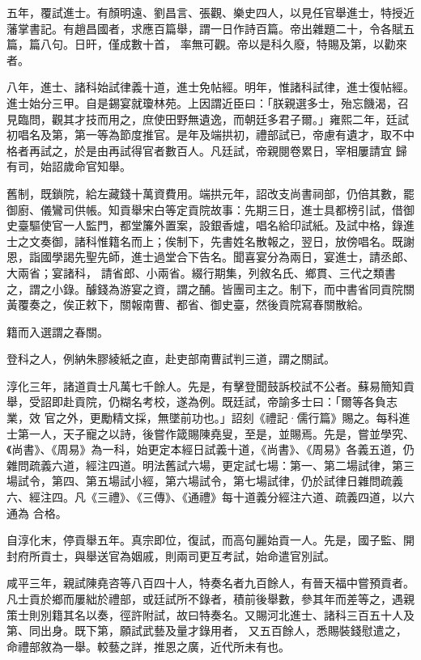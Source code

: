 \begin{pinyinscope}
 五年，覆試進士。有顏明遠、劉昌言、張觀、樂史四人，以見任官舉進士，特授近藩掌書記。有趙昌國者，求應百篇舉，謂一日作詩百篇。帝出雜題二十，令各賦五篇，篇八句。日旰，僅成數十首，
 率無可觀。帝以是科久廢，特賜及第，以勸來者。



 八年，進士、諸科始試律義十道，進士免帖經。明年，惟諸科試律，進士復帖經。進士始分三甲。自是錫宴就瓊林苑。上因謂近臣曰：「朕親選多士，殆忘饑渴，召見臨問，觀其才技而用之，庶使田野無遺逸，而朝廷多君子爾。」雍熙二年，廷試初唱名及第，第一等為節度推官。是年及端拱初，禮部試已，帝慮有遺才，取不中格者再試之，於是由再試得官者數百人。凡廷試，帝親閱卷累日，宰相屢請宜
 歸有司，始詔歲命官知舉。



 舊制，既鎖院，給左藏錢十萬資費用。端拱元年，詔改支尚書祠部，仍倍其數，罷御廚、儀鸞司供帳。知貢舉宋白等定貢院故事：先期三日，進士具都榜引試，借御史臺驅使官一人監門，都堂簾外置案，設銀香爐，唱名給印試紙。及試中格，錄進士之文奏御，諸科惟籍名而上；俟制下，先書姓名散報之，翌日，放傍唱名。既謝恩，詣國學謁先聖先師，進士過堂合下告名。聞喜宴分為兩日，宴進士，請丞郎、大兩省；宴諸科，
 請省郎、小兩省。綴行期集，列敘名氏、鄉貫、三代之類書之，謂之小錄。醵錢為游宴之資，謂之酺。皆團司主之。制下，而中書省同貢院關黃覆奏之，俟正敕下，關報南曹、都省、御史臺，然後貢院寫春關散給。



 籍而入選謂之春關。



 登科之人，例納朱膠綾紙之直，赴吏部南曹試判三道，謂之關試。



 淳化三年，諸道貢士凡萬七千餘人。先是，有擊登聞鼓訴校試不公者。蘇易簡知貢舉，受詔即赴貢院，仍糊名考校，遂為例。既廷試，帝諭多士曰：「爾等各負志業，效
 官之外，更勵精文採，無墜前功也。」詔刻《禮記·儒行篇》賜之。每科進士第一人，天子寵之以詩，後嘗作箴賜陳堯叟，至是，並賜焉。先是，嘗並學究、《尚書》、《周易》為一科，始更定本經日試義十道，《尚書》、《周易》各義五道，仍雜問疏義六道，經注四道。明法舊試六場，更定試七場：第一、第二場試律，第三場試令，第四、第五場試小經，第六場試令，第七場試律，仍於試律日雜問疏義六、經注四。凡《三禮》、《三傳》、《通禮》每十道義分經注六道、疏義四道，以六通為
 合格。



 自淳化末，停貢舉五年。真宗即位，復試，而高句麗始貢一人。先是，國子監、開封府所貢士，與舉送官為姻戚，則兩司更互考試，始命遣官別試。



 咸平三年，親試陳堯咨等八百四十人，特奏名者九百餘人，有晉天福中嘗預貢者。凡士貢於鄉而屢絀於禮部，或廷試所不錄者，積前後舉數，參其年而差等之，遇親策士則別籍其名以奏，徑許附試，故曰特奏名。又賜河北進士、諸科三百五十人及第、同出身。既下第，願試武藝及量才錄用者，
 又五百餘人，悉賜裝錢慰遣之，命禮部敘為一舉。較藝之詳，推恩之廣，近代所未有也。




\end{pinyinscope}
